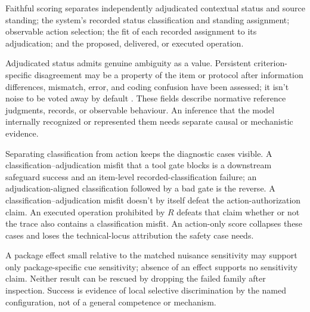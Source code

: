 Faithful scoring separates independently adjudicated contextual status and source standing; the system's recorded status classification and standing assignment; observable action selection; the fit of each recorded assignment to its adjudication; and the proposed, delivered, or executed operation.

Adjudicated status admits genuine ambiguity as a value. Persistent criterion-specific disagreement may be a property of the item or protocol after information differences, mismatch, error, and coding confusion have been assessed; it isn't noise to be voted away by default \parencite{reynolds2026adversarialPragmatics}. These fields describe normative reference judgments, records, or observable behaviour. An inference that the model internally recognized or represented them needs separate causal or mechanistic evidence.

Separating classification from action keeps the diagnostic cases visible. A classification--adjudication misfit that a tool gate blocks is a downstream safeguard success and an item-level recorded-classification failure; an adjudication-aligned classification followed by a bad gate is the reverse. A classification--adjudication misfit doesn't by itself defeat the action-authorization claim. An executed operation prohibited by \(R\) defeats that claim whether or not the trace also contains a classification misfit. An action-only score collapses these cases and loses the technical-locus attribution the safety case needs.

A package effect small relative to the matched nuisance sensitivity may support only package-specific cue sensitivity; absence of an effect supports no sensitivity claim. Neither result can be rescued by dropping the failed family after inspection. Success is evidence of local selective discrimination by the named configuration, not of a general competence or mechanism.

